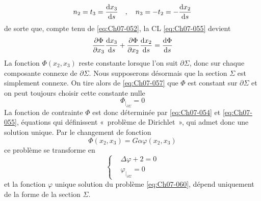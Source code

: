 \begin{equation}
    n_2 = t_3 = \frac{\mathrm{d} x_3}{\mathrm{d} s} \quad , \quad n_3 = -t_2 = - \frac{\mathrm{d} x_2}{\mathrm{d} s}
    \label{eq:Ch07-056}
\end{equation}
de sorte que, compte tenu de \eqref{eq:Ch07-052}, la CL \eqref{eq:Ch07-055} devient
\begin{equation}
    \frac{\partial \Phi}{\partial x_3} \frac{\mathrm{d} x_3}{\mathrm{d} s} + \frac{\partial \Phi}{\partial x_2} \frac{\mathrm{d} x_2}{\mathrm{d} s} = \frac{\mathrm{d} \Phi}{\mathrm{d} s}
    \label{eq:Ch07-057}
\end{equation}
La fonction $\Phi\left( x_2, x_3 \right)$ reste constante lorsque l'on suit $\partial \Sigma$, donc sur chaque composante connexe de $\partial \Sigma$.
Nous supposerons désormais que la section $\Sigma$ est simplement connexe.
On tire alors de \eqref{eq:Ch07-057} que $\Phi$ est constant sur $\partial \Sigma$ et on peut toujours choisir cette constante nulle
\begin{equation}
    \Phi_{|_{\partial \Sigma}} = 0
    \label{eq:Ch07-058}
\end{equation}
La fonction de contrainte $\Phi$ est donc déterminée par \eqref{eq:Ch07-054} et \eqref{eq:Ch07-055}, équations qui définissent «~problème de Dirichlet~», qui admet donc une solution unique.
Par le changement de fonction
\begin{equation}
    \Phi \left( x_2, x_3 \right) = G \alpha \varphi \left( x_2, x_3 \right)
    \label{eq:Ch07-059}
\end{equation}
ce problème se transforme en
\begin{equation}
    \left\{
    \begin{aligned}
        & \Delta \varphi + 2 = 0 \\
        & \varphi_{|_{\partial \Sigma}} = 0
    \end{aligned}
    \right.
    \label{eq:Ch07-060}
\end{equation}
et la fonction $\varphi$ unique solution du problème \eqref{eq:Ch07-060}, dépend uniquement de la forme de la section $\Sigma$.

